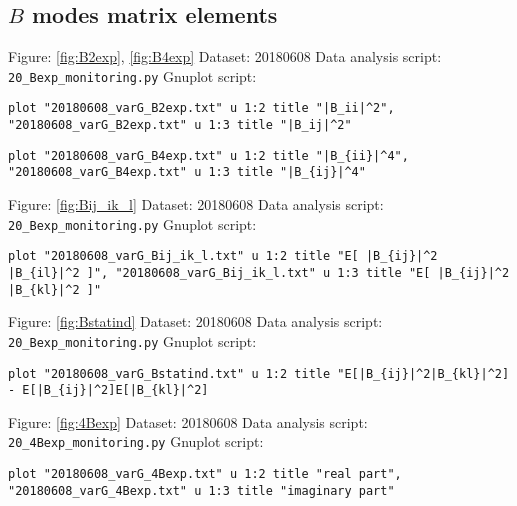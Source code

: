 \documentclass[12pt,a4paper]{article}
\begin{document}
\subsection{$B$ modes matrix elements}
Figure: \ref{fig:B2exp}, \ref{fig:B4exp} \newline
Dataset: 20180608\newline
Data analysis script: \verb|20_Bexp_monitoring.py|\newline
Gnuplot script:
\begin{lstlisting}
plot "20180608_varG_B2exp.txt" u 1:2 title "|B_ii|^2", "20180608_varG_B2exp.txt" u 1:3 title "|B_ij|^2"
\end{lstlisting}
\begin{lstlisting}
plot "20180608_varG_B4exp.txt" u 1:2 title "|B_{ii}|^4", "20180608_varG_B4exp.txt" u 1:3 title "|B_{ij}|^4"
\end{lstlisting}
\mbox{}\newline
Figure: \ref{fig:Bij_ik_l} \newline
Dataset: 20180608\newline
Data analysis script: \verb|20_Bexp_monitoring.py|\newline
Gnuplot script:
\begin{lstlisting}
plot "20180608_varG_Bij_ik_l.txt" u 1:2 title "E[ |B_{ij}|^2 |B_{il}|^2 ]", "20180608_varG_Bij_ik_l.txt" u 1:3 title "E[ |B_{ij}|^2 |B_{kl}|^2 ]"
\end{lstlisting}
\mbox{}\newline
Figure: \ref{fig:Bstatind} \newline
Dataset: 20180608\newline
Data analysis script: \verb|20_Bexp_monitoring.py|\newline
Gnuplot script:
\begin{lstlisting}
plot "20180608_varG_Bstatind.txt" u 1:2 title "E[|B_{ij}|^2|B_{kl}|^2] - E[|B_{ij}|^2]E[|B_{kl}|^2]
\end{lstlisting}
\mbox{}\newline
Figure: \ref{fig:4Bexp} \newline
Dataset: 20180608\newline
Data analysis script: \verb|20_4Bexp_monitoring.py|\newline
Gnuplot script:
\begin{lstlisting}
plot "20180608_varG_4Bexp.txt" u 1:2 title "real part", "20180608_varG_4Bexp.txt" u 1:3 title "imaginary part"
\end{lstlisting}

\newpage
\end{document}
